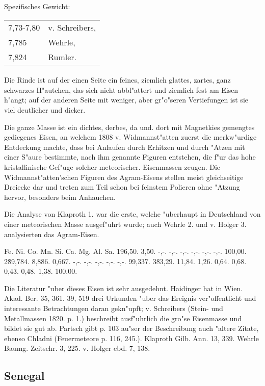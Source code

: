 \documentclass[a4paper, 11pt, oneside]{article}
\begin{document}
Spezifisches Gewicht:  
\begin{table}[!ht]
    \centering
    \begin{tabular}{l l}
        7,73-7,80 & v. Schreibers,\\
        7,785 & Wehrle,\\
        7,824 & Rumler.
    \end{tabular}
\end{table}
\paragraph{}
Die Rinde ist auf der einen Seite ein feines, ziemlich glattes, zartes, ganz schwarzes H"autchen, das sich nicht abbl"attert und ziemlich fest am Eisen h"angt; auf der anderen Seite mit weniger, aber gr"o"seren Vertiefungen ist sie viel deutlicher und dicker.

Die ganze Masse ist ein dichtes, derbes, da und. dort mit Magnetkies gemengtes gediegenes Eisen, an welchem 1808 v. Widmannst"atten zuerst die merkw"urdige Entdeckung machte, dass bei Anlaufen durch Erhitzen und durch "Atzen mit einer S"aure bestimmte, nach ihm genannte Figuren entstehen, die f"ur das hohe kristallinische Gef"uge solcher meteorischer. Eisenmassen zeugen. Die Widmannst"atten'schen Figuren des Agram-Eisens stellen meist gleichseitige Dreiecke dar und treten zum Teil schon bei feinstem Polieren ohne "Atzung hervor, besonders beim Anhauchen.

Die Analyse von Klaproth 1. war die erste, welche "uberhaupt in Deutschland von einer meteorischen Masse ausgef"uhrt wurde; auch Wehrle 2. und v. Holger 3. analysierten das Agram-Eisen.

Fe. Ni. Co. Mn. Si. Ca. Mg. Al. Sa.  
1\. 96,50. 3,50. -,-. -,-. -,-. -,-. -,-. -,-. 100,00.  
2\. 89,784. 8,886. 0,667. -,-. -,-. -,-. -,-. -,-. 99,337.  
3\. 83,29. 11,84. 1,26. 0,64. 0,68. 0,43. 0,48. 1,38. 100,00.

Die Literatur "uber dieses Eisen ist sehr ausgedehnt. Haidinger hat in Wien. Akad. Ber. 35, 361. 39, 519 drei Urkunden "uber das Ereignis ver"offentlicht und interessante Betrachtungen daran gekn"upft; v. Schreibers (Stein- und Metallmassen 1820. p. 1.) beschreibt ausf"uhrlich die gro"se Eisenmasse und bildet sie gut ab. Partsch gibt p. 103 au"ser der Beschreibung auch "altere Zitate, ebenso Chladni (Feuermeteore p. 116, 245.). Klaproth Gilb. Ann. 13, 339. Wehrle Baumg. Zeitschr. 3, 225. v. Holger ebd. 7, 138.

\subsection{Senegal}
\end{document}
